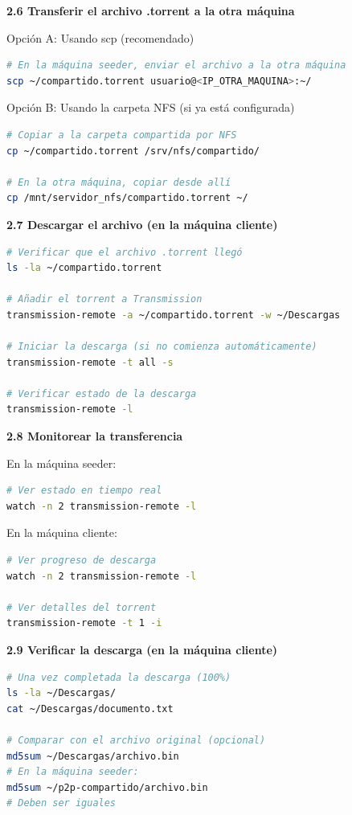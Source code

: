 \documentclass[12pt,a4paper]{report}
\begin{document}
\textbf{2.6 Transferir el archivo .torrent a la otra máquina}

Opción A: Usando scp (recomendado)
\begin{lstlisting}[language=bash]
# En la máquina seeder, enviar el archivo a la otra máquina
scp ~/compartido.torrent usuario@<IP_OTRA_MAQUINA>:~/
\end{lstlisting}

Opción B: Usando la carpeta NFS (si ya está configurada)
\begin{lstlisting}[language=bash]
# Copiar a la carpeta compartida por NFS
cp ~/compartido.torrent /srv/nfs/compartido/

# En la otra máquina, copiar desde allí
cp /mnt/servidor_nfs/compartido.torrent ~/
\end{lstlisting}

\textbf{2.7 Descargar el archivo (en la máquina cliente)}
\begin{lstlisting}[language=bash]
# Verificar que el archivo .torrent llegó
ls -la ~/compartido.torrent

# Añadir el torrent a Transmission
transmission-remote -a ~/compartido.torrent -w ~/Descargas

# Iniciar la descarga (si no comienza automáticamente)
transmission-remote -t all -s

# Verificar estado de la descarga
transmission-remote -l
\end{lstlisting}

\textbf{2.8 Monitorear la transferencia}

En la máquina seeder:
\begin{lstlisting}[language=bash]
# Ver estado en tiempo real
watch -n 2 transmission-remote -l
\end{lstlisting}

En la máquina cliente:
\begin{lstlisting}[language=bash]
# Ver progreso de descarga
watch -n 2 transmission-remote -l

# Ver detalles del torrent
transmission-remote -t 1 -i
\end{lstlisting}

\textbf{2.9 Verificar la descarga (en la máquina cliente)}
\begin{lstlisting}[language=bash]
# Una vez completada la descarga (100%)
ls -la ~/Descargas/
cat ~/Descargas/documento.txt

# Comparar con el archivo original (opcional)
md5sum ~/Descargas/archivo.bin
# En la máquina seeder:
md5sum ~/p2p-compartido/archivo.bin
# Deben ser iguales
\end{lstlisting}
\end{document}
